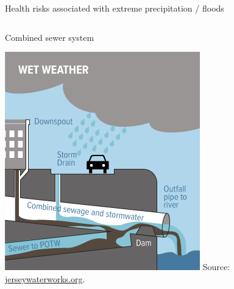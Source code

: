 \documentclass[ignorenonframetext,]{beamer}
\begin{document}
\begin{frame}{Health risks associated with extreme precipitation /
floods}

\begin{columns}

\begin{column}{0.45\textwidth}
\begin{center}
\small Combined sewer system
\vspace{-0.1cm}
\end{center}

\includegraphics[width=\textwidth]{combined_sewer} 
\vspace{-0.1cm}
\scriptsize Source: \url{jerseywaterworks.org}.
\end{column}


\end{columns}
\end{frame}
\end{document}
